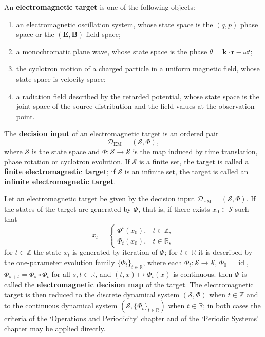 \begin{definition}\label{def:em_target}
An \textbf{electromagnetic target} is one of the following objects:
\begin{enumerate}[label=(\roman*)]
    \item an electromagnetic oscillation system, whose state space is the $(q,p)$ phase space or the $(\mathbf E,\mathbf B)$ field space;
    \item a monochromatic plane wave, whose state space is the phase $\theta=\mathbf k\cdot\mathbf r-\omega t$;
    \item the cyclotron motion of a charged particle in a uniform magnetic field, whose state space is velocity space;
    \item a radiation field described by the retarded potential, whose state space is the joint space of the source distribution and the field values at the observation point.
\end{enumerate}
The \textbf{decision input} of an electromagnetic target is an ordered pair
\[
\mathcal D_{\mathrm{EM}}=(\mathcal S,\Phi),
\]
where $\mathcal S$ is the state space and $\Phi:\mathcal S\to\mathcal S$ is the map induced by time translation, phase rotation or cyclotron evolution. If $\mathcal S$ is a finite set, the target is called a \textbf{finite electromagnetic target}; if $\mathcal S$ is an infinite set, the target is called an \textbf{infinite electromagnetic target}.
\end{definition}

\begin{definition}\label{def:em_periodization}
Let an electromagnetic target be given by the decision input $\mathcal D_{\mathrm{EM}}=(\mathcal S,\Phi)$. If the states of the target are generated by $\Phi$, that is, if there exists $x_0\in\mathcal S$ such that
\[
x_t=\begin{cases}\Phi^t(x_0), & t\in\mathbb Z,\\ \Phi_t(x_0), & t\in\mathbb R,\end{cases}
\]
for $t\in\mathbb Z$ the state $x_t$ is generated by iteration of $\Phi$; for $t\in\mathbb R$ it is described by the one-parameter evolution family $\{\Phi_t\}_{t\in\mathbb R}$, where each $\Phi_t:\mathcal S\to\mathcal S$, $\Phi_0=\operatorname{id}$, $\Phi_{s+t}=\Phi_s\circ\Phi_t$ for all $s,t\in\mathbb R$, and $(t,x)\mapsto\Phi_t(x)$ is continuous.
then $\Phi$ is called the \textbf{electromagnetic decision map} of the target. The electromagnetic target is then reduced to the discrete dynamical system $(\mathcal S,\Phi)$ when $t\in\mathbb Z$ and to the continuous dynamical system $(\mathcal S,\{\Phi_t\}_{t\in\mathbb R})$ when $t\in\mathbb R$; in both cases the criteria of the `Operations and Periodicity' chapter and of the `Periodic Systems' chapter may be applied directly.
\end{definition}


